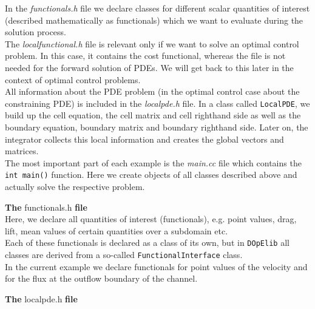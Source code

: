 In the \textit{functionals.h} file we declare classes for different scalar quantities of interest (described mathematically as functionals) which we want to evaluate during the solution process.\\

The \textit{localfunctional.h} file is relevant only if we want to solve an optimal control problem. In this case, it contains the cost functional, whereas the file is not needed for the forward solution of PDEs. We will get back to this later in the context of optimal control problems.\\

All information about the PDE problem (in the optimal control case about the constraining PDE) is included in the \textit{localpde.h} file. In a class called \texttt{LocalPDE}, we build up the cell equation, the cell matrix and cell righthand side as well as the boundary equation, boundary matrix and boundary righthand side. Later on, the integrator collects this local information and creates the global vectors and matrices.\\

The most important part of each example is the \textit{main.cc} file which contains the \texttt{int main()} function. Here we create objects of all classes described above and actually solve the respective problem.\\
 
\vspace{0.2cm}

\textbf{The} functionals.h \textbf{file}\\

\vspace{0.2cm}
Here, we declare all quantities of interest (functionals), e.g. point values, drag, lift, mean values of certain quantities over a subdomain etc. \\
Each of these functionals is declared as a class of its own, but in \texttt{DOpElib} all classes are derived from a so-called \texttt{FunctionalInterface} class.\\
In the current example we declare functionals for point values of the velocity and for the flux at the outflow boundary of the channel. \\

\vspace{0.2cm}

\textbf{The} localpde.h \textbf{file}\\


